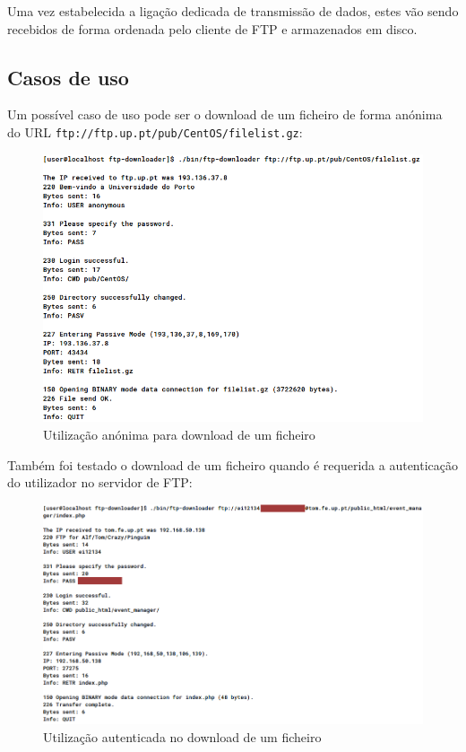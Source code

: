 \documentclass[a4paper,11pt,titlepage]{article}
\begin{document}
Uma vez estabelecida a ligação dedicada de transmissão de dados, estes vão
sendo recebidos de forma ordenada pelo cliente de FTP e armazenados em disco.

\subsection*{Casos de uso}
Um possível caso de uso pode ser o download de um ficheiro de forma anónima do
URL \texttt{ftp://ftp.up.pt/pub/CentOS/filelist.gz}:

\begin{figure}[H]
    \center
    \includegraphics[scale=0.45]{res/anonymous.png}
    \caption{Utilização anónima para download de um ficheiro}
    \label{fig:anonymous.png}
\end{figure}

Também foi testado o download de um ficheiro quando é requerida a autenticação
do utilizador no servidor de FTP:

\begin{figure}[H]
    \center
    \includegraphics[scale=0.45]{res/authenticated.png}
    \caption{Utilização autenticada no download de um ficheiro}
    \label{fig:authenticated.png}
\end{figure}
\end{document}
